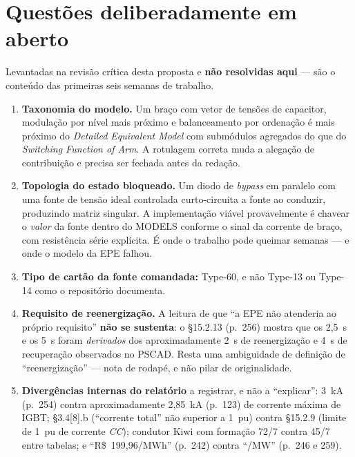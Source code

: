 \documentclass[12pt,a4paper]{article}
\begin{document}
\section{Questões deliberadamente em aberto}

Levantadas na revisão crítica desta proposta e \textbf{não resolvidas aqui} --- são o conteúdo das
primeiras seis semanas de trabalho.

\begin{enumerate}
  \item \textbf{Taxonomia do modelo.} Um braço com vetor de tensões de capacitor, modulação por nível
        mais próximo e balanceamento por ordenação é mais próximo do \emph{Detailed Equivalent Model}
        \cite{gnanarathna2011} com submódulos agregados do que do \emph{Switching Function of Arm}.
        A rotulagem correta muda a alegação de contribuição e precisa ser fechada antes da redação.
  \item \textbf{Topologia do estado bloqueado.} Um diodo de \emph{bypass} em paralelo com uma fonte de
        tensão ideal controlada curto-circuita a fonte ao conduzir, produzindo matriz singular. A
        implementação viável provavelmente é chavear o \emph{valor} da fonte dentro do MODELS conforme
        o sinal da corrente de braço, com resistência série explícita. É onde o trabalho pode queimar
        semanas --- e onde o modelo da EPE falhou.
  \item \textbf{Tipo de cartão da fonte comandada:} Type-60, e não Type-13 ou Type-14 como o
        repositório documenta.
  \item \textbf{Requisito de reenergização.} A leitura de que \enquote{a EPE não atenderia ao próprio
        requisito} \textbf{não se sustenta}: o \S15.2.13 (p.~256) mostra que os 2,5~s e os 5~s foram
        \emph{derivados} dos aproximadamente 2~s de reenergização e 4~s de recuperação observados no
        PSCAD. Resta uma ambiguidade de definição de \enquote{reenergização} --- nota de rodapé, e não
        pilar de originalidade.
  \item \textbf{Divergências internas do relatório} a registrar, e não a \enquote{explicar}: 3~kA
        (p.~254) contra aproximadamente 2,85~kA (p.~123) de corrente máxima de IGBT; \S3.4[8].b
        (\enquote{corrente total} não superior a 1~pu) contra \S15.2.9 (limite de 1~pu de corrente
        \emph{CC}); condutor Kiwi com formação 72/7 contra 45/7 entre tabelas; e
        \enquote{R\$~199,96/MWh} (p.~242) contra \enquote{/MW} (p.~246 e 259).
\end{enumerate}
\end{document}
